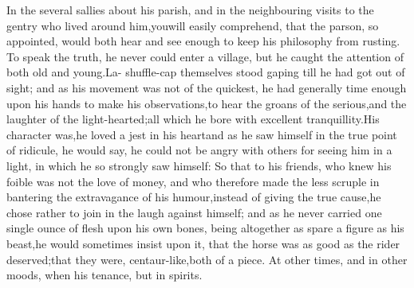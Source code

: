 \documentclass{article}
\begin{document}
In the several sallies about his parish, 
and in the neighbouring visits to the\break
gentry who lived around him,\tsh you\break will easily
comprehend, that the parson, so appointed, would both hear and see
enough to keep his philosophy from\break
rusting. To speak the truth, he never
could enter a village, but he caught the attention
of both old and young.\tsh La-\break
{}
\break shuffle-cap themselves
stood gaping till he had got out of sight; and as his\break
movement was
not of the quickest, he had generally time enough upon his\break
hands to make his observations,\tsk to hear the groans of the
serious,\tsh and the laughter of the light-hearted;\tsk all which he
bore with excellent tranquillity.\tsk His character was,\tsk he
loved a jest in his heart\tsk and as he saw himself in the true
point of ridicule, he would say, he could not be angry with others
for seeing him in a light, in which he so strongly saw himself: So
that to his friends, who knew his foible was not the love of money,
and who therefore made the less scruple in bantering the
extravagance of his humour,\tsk instead of giving the true
cause,\tsk he chose rather to join in the laugh against himself;
and as he never carried one single ounce of flesh upon his own bones, being altogether
as spare a figure as his beast,\tsk he would sometimes insist
upon it, that the horse was as good as the rider
deserved;\tsk that they were, centaur-like,\tsk both of a
piece. At other times, and in other moods, when his\break
{} 
tenance, but in spirits.
\end{document}
